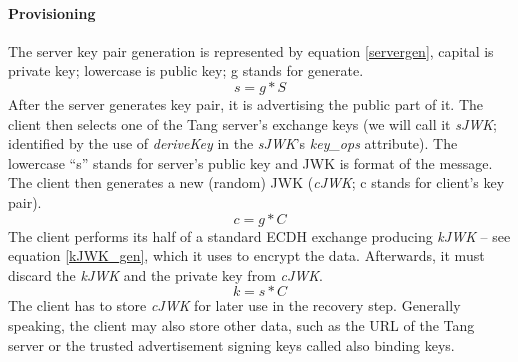 \paragraph{Provisioning}
The server key pair generation is represented by equation \ref{servergen}, capital is private key; lowercase is public key; g stands for generate.
\begin{equation}\label{servergen}
    s = g * S
\end{equation}
After the server generates key pair, it is advertising the public part of it.
The client then selects one of the Tang server's exchange keys (we will call it {\it sJWK}; identified by the use of {\it deriveKey} in the {\it sJWK}'s {\it key\_ops} attribute).
The lowercase “s” stands for server's public key and JWK is format of the message.
The client then generates a new (random) JWK ({\it cJWK}; c stands for client's key pair).
\begin{equation}\label{clientgen}
    c = g * C
\end{equation}
The client performs its half of a standard ECDH exchange producing {\it kJWK} -- see equation \ref{kJWK_gen}, which it uses to encrypt the data.
Afterwards, it must discard the {\it kJWK} and the private key from {\it cJWK}.
\begin{equation}\label{kJWK_gen}
    k = s * C
\end{equation}
The client has to store {\it cJWK} for later use in the recovery step.
Generally speaking, the client may also store other data, such as the URL of the Tang server or the trusted advertisement signing keys called also binding keys.



